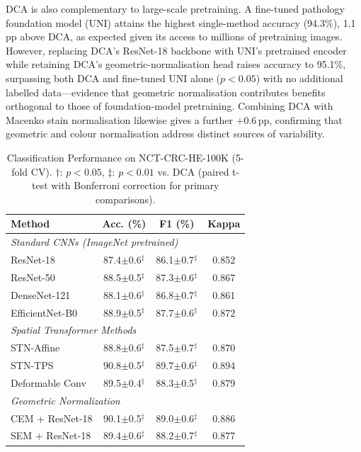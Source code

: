 \documentclass[pdflatex,sn-nature]{sn-jnl}%
\theoremstyle{thmstyleone}%
\theoremstyle{thmstyletwo}%
\theoremstyle{thmstylethree}%
\begin{document}
DCA is also complementary to large-scale pretraining. A fine-tuned pathology
foundation model (UNI) attains the highest single-method accuracy (94.3\%),
1.1\,pp above DCA, as expected given its access to millions of pretraining
images. However, replacing DCA's ResNet-18 backbone with UNI's pretrained encoder
while retaining DCA's geometric-normalisation head raises accuracy to 95.1\%,
surpassing both DCA and fine-tuned UNI alone ($p<0.05$) with no additional
labelled data---evidence that geometric normalisation contributes benefits
orthogonal to those of foundation-model pretraining. Combining DCA with Macenko
stain normalisation likewise gives a further $+0.6$\,pp, confirming that
geometric and colour normalisation address distinct sources of variability.

\begin{table}[t]
\centering
\caption{Classification Performance on NCT-CRC-HE-100K (5-fold CV). $\dagger$: $p<0.05$, $\ddagger$: $p<0.01$ vs. DCA (paired t-test with Bonferroni correction for primary comparisons).}
\label{tab:main_results}
\begin{tabularx}{\textwidth}{Xccc}
\hline
\textbf{Method} & \textbf{Acc. (\%)} & \textbf{F1 (\%)} & \textbf{Kappa} \\
\hline
\multicolumn{4}{l}{\textit{Standard CNNs (ImageNet pretrained)}} \\
ResNet-18 & 87.4$\pm$0.6$^\ddagger$ & 86.1$\pm$0.7$^\ddagger$ & 0.852 \\
ResNet-50 & 88.5$\pm$0.5$^\ddagger$ & 87.3$\pm$0.6$^\ddagger$ & 0.867 \\
DenseNet-121 & 88.1$\pm$0.6$^\ddagger$ & 86.8$\pm$0.7$^\ddagger$ & 0.861 \\
EfficientNet-B0 & 88.9$\pm$0.5$^\ddagger$ & 87.7$\pm$0.6$^\ddagger$ & 0.872 \\
\hline
\multicolumn{4}{l}{\textit{Spatial Transformer Methods}} \\
STN-Affine & 88.8$\pm$0.6$^\ddagger$ & 87.5$\pm$0.7$^\ddagger$ & 0.870 \\
STN-TPS & 90.8$\pm$0.5$^\ddagger$ & 89.7$\pm$0.6$^\ddagger$ & 0.894 \\
Deformable Conv & 89.5$\pm$0.4$^\ddagger$ & 88.3$\pm$0.5$^\ddagger$ & 0.879 \\
\hline
\multicolumn{4}{l}{\textit{Geometric Normalization}} \\
CEM + ResNet-18 & 90.1$\pm$0.5$^\ddagger$ & 89.0$\pm$0.6$^\ddagger$ & 0.886 \\
SEM + ResNet-18 & 89.4$\pm$0.6$^\ddagger$ & 88.2$\pm$0.7$^\ddagger$ & 0.877 \\

\end{tabularx}
\end{table}
\end{document}
